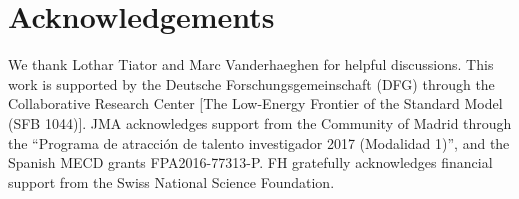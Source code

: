 \documentclass[11pt,preprint,tightenlines,
showpacs,preprintnumbers,amsmath,amssymb,superscriptaddress,a4paper,nofootinbib]{revtex4-1}
\begin{document}
\section*{Acknowledgements}

We thank Lothar Tiator and Marc Vanderhaeghen for helpful discussions. This work is supported by the Deutsche Forschungsgemeinschaft (DFG) through the
Collaborative Research Center [The Low-Energy Frontier of the Standard Model (SFB 1044)]. JMA acknowledges support from the Community of Madrid through the ``Programa de atracci\'on de talento investigador 2017 (Modalidad 1)'', and the Spanish MECD grants FPA2016-77313-P. FH gratefully acknowledges financial support from the Swiss National Science Foundation.



\appendix
\small
\end{document}
